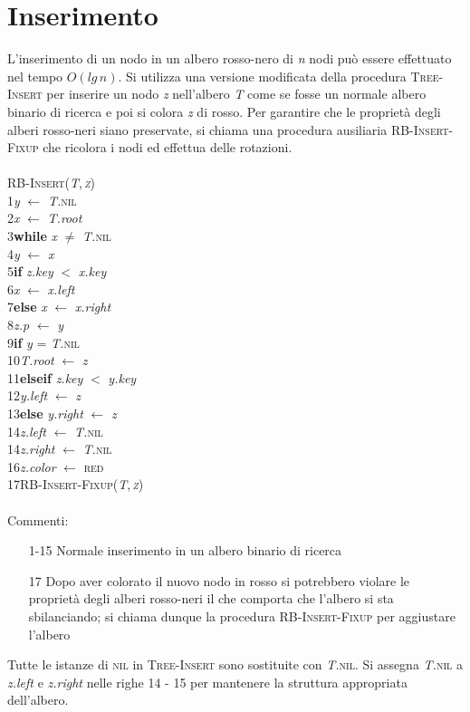 \documentclass[10pt, a4paper]{report}
\newcommand\firsttab[1][0.5cm]{\hspace*{#1}}
\newcommand\secondtab[1][1cm]{\hspace*{#1}}
\newcommand\thirdtab[1][1.5cm]{\hspace*{#1}}
\begin{document}
\section{Inserimento}
L'inserimento di un nodo in un albero rosso-nero di \textit{n} nodi può essere effettuato nel tempo $O(lg\,n)$. Si utilizza una versione modificata della procedura \textsc{Tree-Insert} per inserire un nodo \textit{z} nell'albero \textit{T} come se fosse un normale albero binario di ricerca e poi si colora \textit{z} di rosso. Per garantire che le proprietà degli alberi rosso-neri siano preservate, si chiama una procedura ausiliaria \textsc{RB-Insert-Fixup} che ricolora i nodi ed effettua delle rotazioni.\\\\
\textsc{RB-Insert(\textit{T},\,\textit{z})}\\
1\firsttab\textit{y} $\leftarrow$ \textit{T.}\textsc{nil}\\
2\firsttab\textit{x} $\leftarrow$ \textit{T.root}\\
3\firsttab\textbf{while} \textit{x} $\not=$ \textit{T.}\textsc{nil}\\ 
4\secondtab\textit{y} $\leftarrow$ \textit{x}\\
5\secondtab\textbf{if} \textit{z.key} $<$ \textit{x.key}\\
6\thirdtab\textit{x} $\leftarrow$ \textit{x.left}\\
7\secondtab\textbf{else} \textit{x} $\leftarrow$ \textit{x.right}\\
8\firsttab\textit{z.p} $\leftarrow$ \textit{y}\\
9\firsttab\textbf{if} \textit{y} = \textit{T.}\textsc{nil}\\
10\secondtab\textit{T.root} $\leftarrow$ \textit{z}\\
11\firsttab\textbf{elseif} \textit{z.key} $<$ \textit{y.key}\\
12\secondtab\textit{y.left} $\leftarrow$ \textit{z}\\
13\firsttab\textbf{else} \textit{y.right} $\leftarrow$ \textit{z}\\
14\firsttab\textit{z.left} $\leftarrow$ \textit{T.}\textsc{nil}\\
14\firsttab\textit{z.right} $\leftarrow$ \textit{T.}\textsc{nil}\\
16\firsttab\textit{z.color} $\leftarrow$ \textsc{red}\\
17\firsttab\textsc{RB-Insert-Fixup(\textit{T},\,\textit{z})}\\\\
Commenti:
\begin{enumerate}
\item[1-15]Normale inserimento in un albero binario di ricerca
\item[17]Dopo aver colorato il nuovo nodo in rosso si potrebbero violare le proprietà degli alberi rosso-neri il che comporta che l'albero si sta sbilanciando; si chiama dunque la procedura \textsc{RB-Insert-Fixup} per aggiustare l'albero
\end{enumerate}
Tutte le istanze di \textsc{nil} in \textsc{Tree-Insert} sono sostituite con \textit{T.}\textsc{nil}. Si assegna \textit{T.}\textsc{nil} a \textit{z.left} e \textit{z.right} nelle righe 14 - 15 per mantenere la struttura appropriata dell'albero.
\end{document}
